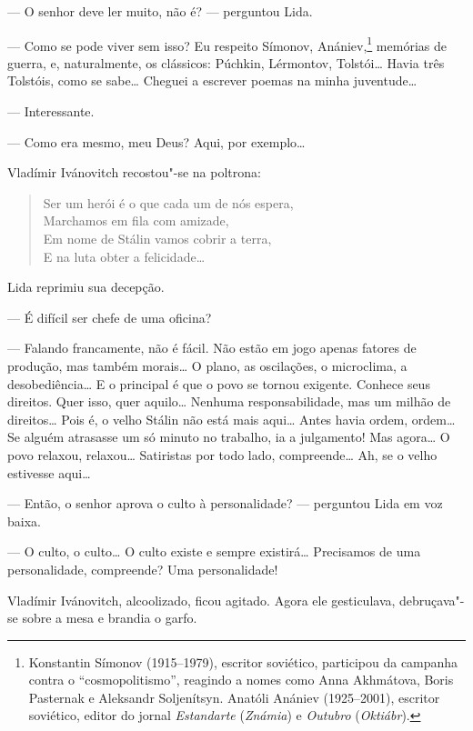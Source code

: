 --- O senhor deve ler muito, não é? --- perguntou Lida.

--- Como se pode viver sem isso? Eu respeito Símonov, Anániev,\footnote{Konstantin
  Símonov (1915--1979), escritor soviético, participou da campanha
  contra o ``cosmopolitismo'', reagindo a nomes como Anna Akhmátova,
  Boris Pasternak e Aleksandr Soljenítsyn. Anatóli Anániev (1925--2001),
  escritor soviético, editor do jornal \emph{Estandarte} (\emph{Známia})
  e \emph{Outubro} (\emph{Oktiábr}).} memórias de guerra, e,
naturalmente, os clássicos: Púchkin, Lérmontov, Tolstói\ldots{} Havia três
Tolstóis, como se sabe\ldots{} Cheguei a escrever poemas na minha
juventude\ldots{}

--- Interessante.

--- Como era mesmo, meu Deus? Aqui, por exemplo\ldots{}

Vladímir Ivánovitch recostou"-se na poltrona:

\begin{verse}
Ser um herói é o que cada um de nós espera,\\
Marchamos em fila com amizade,\\
Em nome de Stálin vamos cobrir a terra,\\
E na luta obter a felicidade\ldots{}
\end{verse}

Lida reprimiu sua decepção.

--- É difícil ser chefe de uma oficina?

--- Falando francamente, não é fácil. Não estão em jogo apenas fatores
de produção, mas também morais\ldots{} O plano, as oscilações, o microclima,
a desobediência\ldots{} E o principal é que o povo se tornou exigente.
Conhece seus direitos. Quer isso, quer aquilo\ldots{} Nenhuma
responsabilidade, mas um milhão de direitos\ldots{} Pois é, o velho Stálin
não está mais aqui\ldots{} Antes havia ordem, ordem\ldots{} Se alguém atrasasse um
só minuto no trabalho, ia a julgamento! Mas agora\ldots{} O povo relaxou,
relaxou\ldots{} Satiristas por todo lado, compreende\ldots{} Ah, se o velho
estivesse aqui\ldots{}

--- Então, o senhor aprova o culto à personalidade? --- perguntou Lida
em voz baixa.

--- O culto, o culto\ldots{} O culto existe e sempre existirá\ldots{} Precisamos
de uma personalidade, compreende? Uma personalidade!

Vladímir Ivánovitch, alcoolizado, ficou agitado. Agora ele gesticulava,
debruçava"-se sobre a mesa e brandia o garfo.

